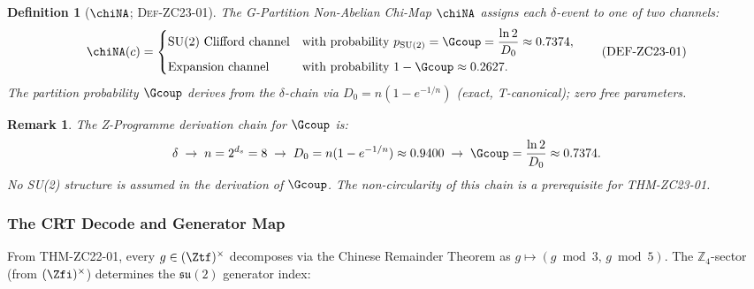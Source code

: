 \documentclass[12pt, a4paper]{article}
\newtheorem{definition}{Definition}[section]
\newtheorem{remark}{Remark}[section]
\begin{document}
\begin{definition}[$\chiNA$; \textsc{Def-ZC23-01}]
\label{zc23:def:china}
The \emph{G-Partition Non-Abelian Chi-Map} $\chiNA$ assigns each
$\delta$-event to one of two channels:
\begin{equation}
  \chiNA(c) = \begin{cases}
    \text{SU(2) Clifford channel} & \text{with probability }
      p_{\rm SU(2)} = \Gcoup = \dfrac{\ln 2}{D_0} \approx 0.7374,\\[6pt]
    \text{Expansion channel}      & \text{with probability }
      1-\Gcoup \approx 0.2627.
  \end{cases}
  \tag{DEF-ZC23-01}
\end{equation}
The partition probability $\Gcoup$ derives from the $\delta$-chain via
$D_0 = n(1-e^{-1/n})$ (exact, T-canonical); zero free parameters.
\end{definition}

\begin{remark}
The Z-Programme derivation chain for $\Gcoup$ is:
\[
  \delta \;\to\; n = 2^{d_s} = 8
  \;\to\; D_0 = n(1-e^{-1/n}) \approx 0.9400
  \;\to\; \Gcoup = \frac{\ln 2}{D_0} \approx 0.7374.
\]
No SU(2) structure is assumed in the derivation of $\Gcoup$.
The non-circularity of this chain is a prerequisite for THM-ZC23-01.
\end{remark}

\subsubsection{The CRT Decode and Generator Map}

From THM-ZC22-01, every $g\in(\Ztf)^\times$ decomposes via the
Chinese Remainder Theorem as $g\mapsto(g\bmod 3,\, g\bmod 5)$.
The $\mathbb{Z}_4$-sector (from $(\Zfi)^\times$) determines the
$\mathfrak{su}(2)$ generator index:
\end{document}
